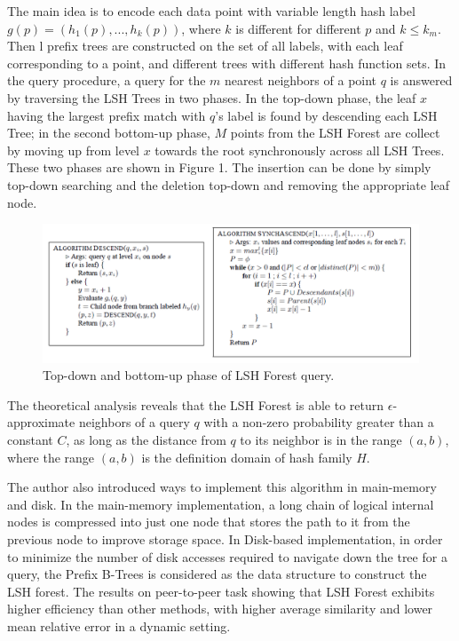 The main idea is to encode each data point with variable length hash label $g(p)=(h_1(p), ..., h_k(p))$, where $k$ is different for different $p$ and $k\leq k_m$. Then l prefix trees are constructed on the set of all labels, with each leaf corresponding to a point, and different trees with different hash function sets. In the query procedure, a query for the $m$ nearest neighbors of a point $q$ is answered by traversing the LSH Trees in two phases. In the top-down phase, the leaf $x$ having the largest prefix match with $q$'s label is found by descending each LSH Tree; in the second bottom-up phase, $M$ points from the LSH Forest are collect by moving up from level $x$ towards the root synchronously across all LSH Trees. These two phases are shown in Figure 1. The insertion can be done by simply top-down searching and the deletion top-down and removing the appropriate leaf node.
\begin{figure}
	\begin{center}
		\includegraphics[width=6in]{figures/1.png}
		\caption{Top-down and bottom-up phase of LSH Forest query.}
	\end{center}
\end{figure}

The theoretical analysis reveals that the LSH Forest is able to return $\epsilon$-approximate neighbors of a query $q$ with a non-zero probability greater than a constant $C$, as long as the distance from $q$ to its neighbor is in the range $(a,b)$, where the range $(a,b)$ is the definition domain of hash family $H$. 

The author also introduced ways to implement this algorithm in main-memory and disk. In the main-memory implementation, a long chain of logical internal nodes is compressed into just one node that stores the path to it from the previous node to improve storage space. In Disk-based implementation, in order to minimize the number of disk accesses required to navigate down the tree for a query, the Prefix B-Trees is considered as the data structure to construct the LSH forest. The results on peer-to-peer task showing that LSH Forest exhibits higher efficiency than other methods, with higher average similarity and lower mean relative error in a dynamic setting.
